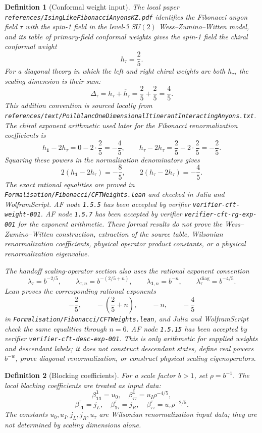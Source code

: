 \documentclass[11pt]{article}
\newtheorem{definition}{Definition}[section]
\begin{document}
\begin{definition}[Conformal weight input]
The local paper \texttt{references/IsingLikeFibonacciAnyonsKZ.pdf} identifies
the Fibonacci anyon field \(\tau\) with the spin-1 field in the level-3
\(SU(2)\) Wess--Zumino--Witten model, and its table of primary-field
conformal weights gives the spin-1 field the chiral conformal weight
\[
h_\tau=\frac{2}{5}.
\]
For a diagonal theory in which the left and right chiral weights are both
\(h_\tau\), the scaling dimension is their sum:
\[
\Delta_\tau=h_\tau+\overline h_\tau=\frac{2}{5}+\frac{2}{5}=\frac{4}{5}.
\]
This addition convention is sourced locally from
\texttt{references/text/PoilblancOneDimensionalItinerantInteractingAnyons.txt}.
The chiral exponent arithmetic used later for the Fibonacci renormalization
coefficients is
\[
h_{\mathbf 1}-2h_\tau=0-2\cdot\frac25=-\frac45,
\qquad
h_\tau-2h_\tau=\frac25-2\cdot\frac25=-\frac25.
\]
Squaring these powers in the normalisation denominators gives
\[
2\left(h_{\mathbf 1}-2h_\tau\right)=-\frac85,
\qquad
2\left(h_\tau-2h_\tau\right)=-\frac45.
\]
The exact rational equalities are proved in
\texttt{Formalisation/Fibonacci/CFTWeights.lean} and checked in Julia and
WolframScript. AF node \texttt{1.5.5} has been accepted by verifier
\texttt{verifier-cft-weight-001}. AF node \texttt{1.5.7} has been accepted by
verifier \texttt{verifier-cft-rg-exp-001} for the exponent arithmetic. These
formal results do not prove the Wess--Zumino--Witten construction, extraction
of the source table, Wilsonian renormalization coefficients, physical operator
product constants, or a physical renormalization eigenvalue.

The handoff scaling-operator section also uses the rational exponent
convention
\[
\lambda_\tau=b^{-2/5},\qquad
\lambda_{\tau,n}=b^{-(2/5+n)},\qquad
\lambda_{\mathbf 1,n}=b^{-n},\qquad
\lambda_\tau^{\mathrm{diag}}=b^{-4/5}.
\]
Lean proves the corresponding rational exponents
\[
-\frac25,\qquad -\left(\frac25+n\right),\qquad -n,\qquad -\frac45
\]
in \texttt{Formalisation/Fibonacci/CFTWeights.lean}, and Julia and
WolframScript check the same equalities through \(n=6\). AF node
\texttt{1.5.15} has been accepted by verifier
\texttt{verifier-cft-desc-exp-001}. This is only arithmetic for supplied
weights and descendant labels; it does not construct descendant states,
define real powers \(b^{-w}\), prove diagonal renormalization, or construct
physical scaling eigenoperators.
\end{definition}

\begin{definition}[Blocking coefficients]
For a scale factor \(b>1\), set \(\rho=b^{-1}\). The local blocking
coefficients are treated as input data:
\[
\beta^{\mathbf 1}_{\mathbf 1\mathbf 1}=u_0,\quad
\beta^{\mathbf 1}_{\tau\tau}=u_I\rho^{-4/5},
\]
\[
\beta^\tau_{\tau\mathbf 1}=j_L,\quad
\beta^\tau_{\mathbf 1\tau}=j_R,\quad
\beta^\tau_{\tau\tau}=u_\tau\rho^{-2/5}.
\]
The constants \(u_0,u_I,j_L,j_R,u_\tau\) are Wilsonian
renormalization input data; they are not determined by scaling dimensions
alone.
\end{definition}
\end{document}
